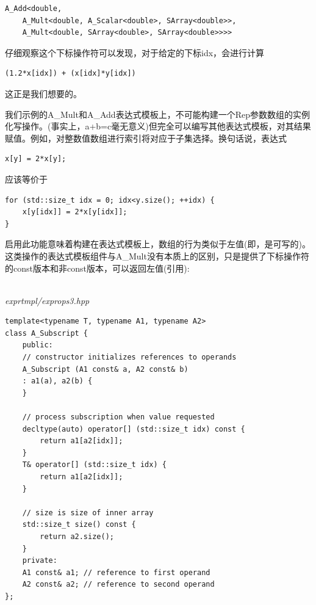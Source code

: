\begin{lstlisting}[style=styleCXX]
A_Add<double,
	A_Mult<double, A_Scalar<double>, SArray<double>>,
	A_Mult<double, SArray<double>, SArray<double>>>>
\end{lstlisting}

仔细观察这个下标操作符可以发现，对于给定的下标idx，会进行计算

\begin{lstlisting}[style=styleCXX]
(1.2*x[idx]) + (x[idx]*y[idx])
\end{lstlisting}

这正是我们想要的。


我们示例的A\_Mult和A\_Add表达式模板上，不可能构建一个Rep参数数组的实例化写操作。(事实上，a+b=c毫无意义)但完全可以编写其他表达式模板，对其结果赋值。例如，对整数值数组进行索引将对应于子集选择。换句话说，表达式

\begin{lstlisting}[style=styleCXX]
x[y] = 2*x[y];
\end{lstlisting}

应该等价于

\begin{lstlisting}[style=styleCXX]
for (std::size_t idx = 0; idx<y.size(); ++idx) {
	x[y[idx]] = 2*x[y[idx]];
}
\end{lstlisting}

启用此功能意味着构建在表达式模板上，数组的行为类似于左值(即，是可写的)。这类操作的表达式模板组件与A\_Mult没有本质上的区别，只是提供了下标操作符的const版本和非const版本，可以返回左值(引用):

\hspace*{\fill} \\ %
\noindent
\textit{exprtmpl/exprops3.hpp}
\begin{lstlisting}[style=styleCXX]
template<typename T, typename A1, typename A2>
class A_Subscript {
	public:
	// constructor initializes references to operands
	A_Subscript (A1 const& a, A2 const& b)
	: a1(a), a2(b) {
	}

	// process subscription when value requested
	decltype(auto) operator[] (std::size_t idx) const {
		return a1[a2[idx]];
	}
	T& operator[] (std::size_t idx) {
		return a1[a2[idx]];
	}

	// size is size of inner array
	std::size_t size() const {
		return a2.size();
	}
	private:
	A1 const& a1; // reference to first operand
	A2 const& a2; // reference to second operand
};
\end{lstlisting}

